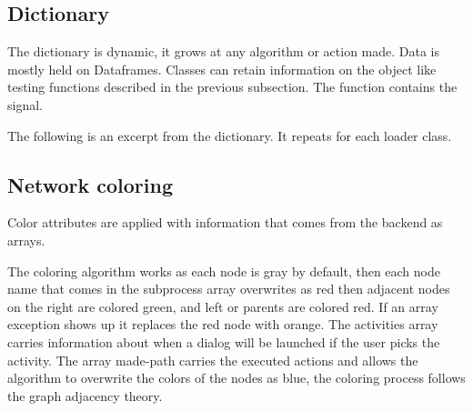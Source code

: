 \documentclass[a4paper]{article}
\begin{document}
\subsection{Dictionary}
\label{sec:org36715b4}

The dictionary is dynamic, it grows at any algorithm or action made. Data is mostly held on Dataframes. Classes can retain information on the object like testing functions described in the previous subsection. The function contains the signal.

The following is an excerpt from the dictionary. It repeats for each loader class.

\medskip
{}

\medskip
{}


\subsection{Network coloring}
\label{sec:org9272f9b}

Color attributes are applied with information that comes from the backend as arrays.

The coloring algorithm works as each node is gray by default, then each node name that comes in the subprocess array overwrites as red then adjacent nodes on the right are colored green, and left or parents are colored red. If an array exception shows up it replaces the red node with orange. The activities array carries information about when a dialog will be launched if the user picks the activity. The array made-path carries the executed actions and allows the algorithm to overwrite the colors of the nodes as blue, the coloring process follows the graph adjacency theory.
\end{document}
